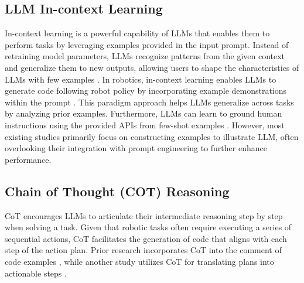 \subsection{LLM In-context Learning}
In-context learning is a powerful capability of LLMs that enables them to perform tasks by leveraging examples provided in the input prompt. Instead of retraining model parameters, LLMs recognize patterns from the given context and generalize them to new outputs, allowing users to shape the characteristics of LLMs with few examples \cite{URIAL}. In robotics, in-context learning enables LLMs to generate code following robot policy by incorporating example demonstrations within the prompt  \cite{CodeasPolicies}. This paradigm approach helps LLMs generalize across tasks by analyzing prior examples. Furthermore, LLMs can learn to ground human instructions using the provided APIs from few-shot examples \cite{PromptBook}. However, most existing studies primarily focus on constructing examples to illustrate LLM, often overlooking their integration with prompt engineering to further enhance performance.


\subsection{Chain of Thought (COT) Reasoning}
CoT \cite{CoT} encourages LLMs to articulate their intermediate reasoning step by step when solving a task. Given that robotic tasks often require executing a series of sequential actions, CoT facilitates the generation of code that aligns with each step of the action plan. Prior research incorporates CoT into the comment of code examples \cite{PromptBook}, while another study utilizes CoT for translating plans into actionable steps \cite{ISR-LLM}. %

